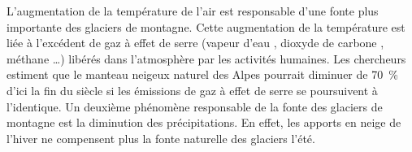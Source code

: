 \documentclass[answers]{exam}
\begin{document}
\begin{tcolorbox}[colback=gray!10!white, colframe=gray, title=Le réchauffement climatique]
  L'augmentation de la température de l'air est responsable d'une fonte plus importante des glaciers de montagne. Cette augmentation de la température est liée à l'excédent de gaz à effet de serre (vapeur d'eau , dioxyde de carbone , méthane …) libérés dans l'atmosphère par les activités humaines. 
  Les chercheurs estiment que le manteau neigeux naturel des Alpes pourrait diminuer de 70~\% d'ici la fin du siècle si les émissions de gaz à effet de serre se poursuivent à l'identique. 
  Un deuxième phénomène responsable de la fonte des glaciers de montagne est la diminution des précipitations. En effet, les apports en neige de l'hiver ne compensent plus la fonte naturelle des glaciers l'été.  
\end{tcolorbox}
\end{document}
